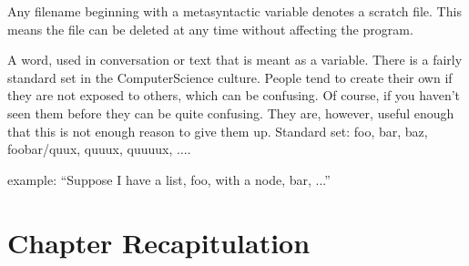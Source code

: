\documentclass[proposal.tex]{subfiles}
\begin{document}
Any filename beginning with a metasyntactic variable denotes a scratch file. This means the file can be deleted at any time without affecting the program.



\cite{webste:metasyntacticvariablesc2wiki}

A word, used in conversation or text that is meant as a variable. There is a fairly standard set in the ComputerScience
culture. People tend to create their own if they are not exposed to others, which can be confusing. Of course, if you haven't seen them before they can be quite confusing. They are, however, useful enough that this is not enough reason to give them up.
Standard set: foo, bar, baz, foobar/quux, quuux, quuuux, ....

example: ``Suppose I have a list, foo, with a node, bar, ...''


\section{Chapter Recapitulation}
\end{document}

